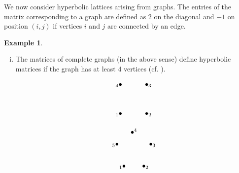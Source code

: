 \documentclass[10pt, preprint]{elsarticle}
\theoremstyle{definition}
\newtheorem{example}[theorem]{Example}
\theoremstyle{definition}
\begin{document}
We now consider hyperbolic lattices arising from graphs. The entries of the matrix corresponding to a graph  are defined as $2$ on the diagonal and $-1$ on position $(i,j)$ if vertices $i$ and $j$ are connected by an edge.
\begin{example}
\begin{enumerate}[(i)]
\item The matrices of complete graphs (in the above sense) define hyperbolic matrices if the graph has at least $4$ vertices (cf. ). 
\begin{figure}[h!]
\begin{minipage}[c]{0.5\textwidth}
\[\xygraph{
                         !{<0cm,0cm>;<1.5cm,0cm>:<0cm,1.5cm>::}
                         !{(0,0)}*+{{}_{1}\bullet}="1"
                         !{(1,0)}*+{\bullet_{2}}="2"
                         !{(1,1)}*+{\bullet_{3}}="3"
                         !{(0,1)}*+{{}_{4}\bullet}="4"
                         "1"-"2"
                         "1"-"3"
                         "1"-"4"
                         "2"-"3"
                         "2"-"4"
                         "3"-"4"
                         }\]
                         
                         \end{minipage}
                         \begin{minipage}[c]{0.5\textwidth}

\[\xygraph{
                         !{<0cm,0cm>;<1cm,0cm>:<0cm,1cm>::}
                         !{(-0.59,-0.81)}*+{{}_{1}\bullet}="1"
                         !{(0.59,-0.81)}*+{\bullet_{2}}="2"
                         !{(0.95,0.31)}*+{\bullet_{3}}="3"
                         !{(0,1)}*+{\bullet^{4}}="4"
                         !{(-0.95,0.31)}*+{{}_{5}\bullet}="5"
                         "1"-"2"
                         "1"-"3"
                         "1"-"4"
                         "1"-"5"
                         "2"-"3"
                         "2"-"4"
                         "2"-"5"
                         "3"-"4"
                         "3"-"5"
                         "4"-"5"
                         }\]
                         

\end{minipage}
\end{figure}
\end{enumerate}
\end{example}
\end{document}
